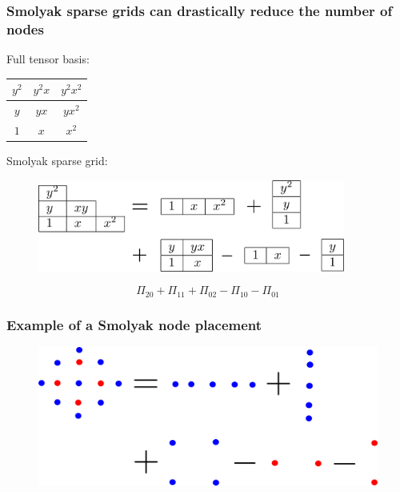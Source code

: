 \documentclass{beamer}
\begin{document}
\begin{frame}
 \frametitle{Smolyak sparse grids can drastically reduce the
 number of nodes}
 \pause
Full tensor basis:
\begin{table}
 \begin{tabular}{|c|c|c|}\hline
 $y^2$&$y^2x$&$y^2x^2$\\\hline
 $y$&$yx$&$yx^2$\\\hline
 $1$&$x$&$x^2$\\\hline
 \end{tabular}
\end{table}
\pause
Smolyak sparse grid:
 \begin{figure}
  \includegraphics[width=0.9\textwidth]{smolyak2.png}
 \end{figure}
\[\Pi_{20} + \Pi_{11} + \Pi_{02} - \Pi_{10} - \Pi_{01}\]
\end{frame}


\begin{frame}
 \frametitle{Example of a Smolyak node placement}
 \begin{figure}
  \includegraphics[width=\textwidth]{smolyak.png}
 \end{figure}

\end{frame}
\end{document}
